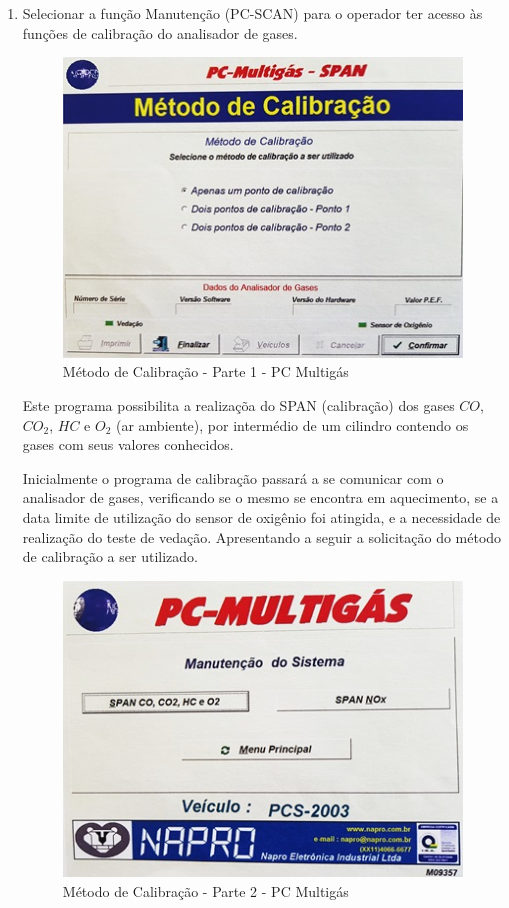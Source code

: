 \begin{enumerate}
	\item Selecionar a função Manutenção (PC-SCAN) para o operador ter acesso às funções de calibração do analisador de gases.

	\begin{figure}[h!]
		\centering
		\includegraphics[keepaspectratio=true,scale= 1.0]{figuras/PLANO1.jpg}
		\caption{Método de Calibração - Parte 1 - PC Multigás}
		\label{metodoCalibracao}
	\end{figure}

	Este programa possibilita a realizaçõa do SPAN (calibração) dos gases $CO$, $CO_{2}$, $HC$ e $O_{2}$ (ar ambiente), por intermédio de um cilindro contendo os gases com seus valores conhecidos.

	Inicialmente o programa de calibração passará a se comunicar com o analisador de gases, verificando se o mesmo se encontra em aquecimento, se a data limite de utilização do sensor de oxigênio foi atingida, e a necessidade de realização do teste de vedação. Apresentando a seguir a solicitação do método de calibração a ser utilizado.

	\begin{figure}[h!]
		\centering
		\includegraphics[keepaspectratio=true,scale= 1.0]{figuras/PLANO2.jpg}
		\caption{Método de Calibração - Parte 2 - PC Multigás}
		\label{metodoCalibracao}
	\end{figure}


\end{enumerate}
